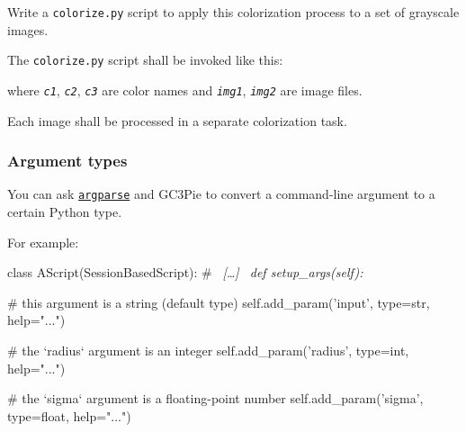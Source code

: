 \documentclass[english,serif,mathserif,xcolor=pdftex,dvipsnames,table]{beamer}
\begin{document}


\begin{frame}[fragile]
  \begin{exercise*}[4.A]
    Write a \texttt{colorize.py} script to apply this colorization process to a set of grayscale images.

    \+
    The \texttt{colorize.py} script shall be invoked like this:
    where \texttt{\em c1}, \texttt{\em c2}, \texttt{\em c3} are color
    names and \texttt{\em img1}, \texttt{\em img2} are image files.

    \+
    Each image shall be processed in a separate colorization task.
  \end{exercise*}
\end{frame}


\begin{frame}[fragile]
  \frametitle{Argument types}

  You can ask
  \href{https://docs.python.org/2/howto/argparse.html}{\texttt{argparse}}
  and GC3Pie to convert a command-line argument to a certain Python type.

  \+ For example:
\begin{python}
class AScript(SessionBasedScript):
  # ~\em [\ldots]~
  def setup_args(self):

    # this argument is a string (default type)
    self.add_param('input',  type=str,   help="...")

    # the `radius` argument is an integer
    self.add_param('radius', type=int,   help="...")

    # the `sigma` argument is a floating-point number
    self.add_param('sigma',  type=float, help="...")
\end{python}
\end{frame}
\end{document}
